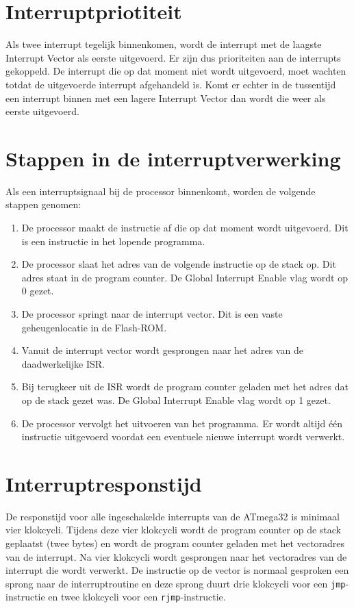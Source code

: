 \section{Interruptpriotiteit}
Als twee interrupt tegelijk binnenkomen, wordt de interrupt met de laagste
Interrupt Vector als eerste uitgevoerd. Er zijn dus prioriteiten aan de
interrupts gekoppeld. De interrupt die op dat moment niet wordt uitgevoerd,
moet wachten totdat de uitgevoerde interrupt afgehandeld is. Komt er echter
in de tussentijd een interrupt binnen met een lagere Interrupt Vector
dan wordt die weer als eerste uitgevoerd.


\section{Stappen in de interruptverwerking}
Als een interruptsignaal bij de processor binnenkomt, worden de volgende
stappen genomen:
\begin{enumerate}
\item De processor maakt de instructie af die op dat moment wordt uitgevoerd.
      Dit is een instructie in het lopende programma.
\item De processor slaat het adres van de volgende instructie op de stack op.
      Dit adres staat in de program counter. De Global Interrupt Enable vlag
      wordt op 0 gezet.
\item De processor springt naar de interrupt vector. Dit is een vaste
      geheugenlocatie in de Flash-ROM.
\item Vanuit de interrupt vector wordt gesprongen naar het adres van de
      daadwerkelijke ISR.
\item Bij terugkeer uit de ISR wordt de program counter geladen met het adres
      dat op de stack gezet was. De Global Interrupt Enable vlag wordt op 1
      gezet.
\item De processor vervolgt het uitvoeren van het programma. Er wordt altijd
      \'e\'en instructie uitgevoerd voordat een eventuele nieuwe interrupt
      wordt verwerkt.
\end{enumerate}


\section{Interruptresponstijd}
De responstijd voor alle ingeschakelde interrupts van de ATmega32 is minimaal
vier klokcycli. Tijdens deze vier klokcycli wordt de program counter op de
stack geplaatst (twee bytes) en wordt de program counter geladen met het
vectoradres van de interrupt. Na vier klokcycli wordt gesprongen naar het
vectoradres van de interrupt die wordt verwerkt. De instructie op de vector
is normaal gesproken een sprong naar de interruptroutine en deze sprong duurt
drie klokcycli voor een \lstinline|jmp|-instructie en twee klokcycli voor een
\lstinline|rjmp|-instructie.

